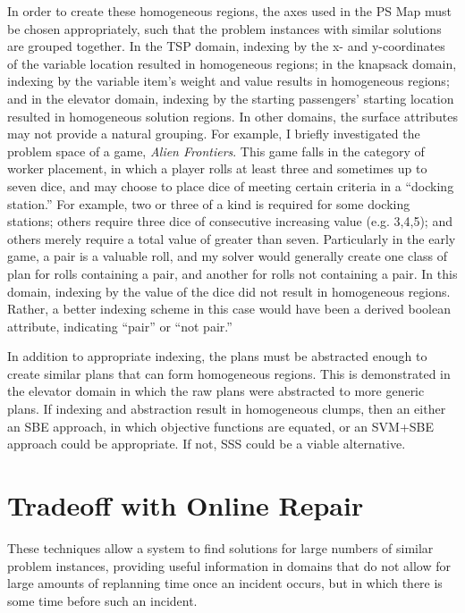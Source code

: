 In order to create these homogeneous regions, the axes used in the PS Map must be chosen appropriately, such that the problem instances with similar solutions are grouped together.  In the TSP domain, indexing by the x- and y-coordinates of the variable location resulted in homogeneous regions; in the knapsack domain, indexing by the variable item's weight and value results in homogeneous regions; and in the elevator domain, indexing by the starting passengers' starting location resulted in homogeneous solution regions.  In other domains, the surface attributes may not provide a natural grouping. For example, I briefly investigated the problem space of a game, \textit{Alien Frontiers}.    This game falls in the category of worker placement, in which a player rolls at least three and sometimes up to seven dice, and may choose to place dice of meeting certain criteria in a ``docking station.''  For example, two or three of a kind is required for some docking stations; others require three dice of consecutive increasing value (e.g. 3,4,5); and others merely require a total value of greater than seven.  Particularly in the early game, a pair is a valuable roll, and my solver would generally create one class of plan for rolls containing a pair, and another for rolls not containing a pair.  In this domain, indexing by the value of the dice did not result in homogeneous regions.  Rather, a better indexing scheme in this case would have been a derived boolean attribute, indicating ``pair'' or ``not pair.''

In addition to appropriate indexing, the plans must be abstracted enough to create similar plans that can form homogeneous regions.  This is demonstrated in the elevator domain in which the raw plans were abstracted to more generic plans.  If indexing and abstraction result in homogeneous clumps, then an either an SBE approach, in which objective functions are equated, or an SVM+SBE approach could be appropriate.  If not, SSS could be a viable alternative.


\section{Tradeoff with Online Repair}
These techniques allow a system to find solutions for large numbers of similar problem instances, providing useful information in domains that do not allow for large amounts of replanning time once an incident occurs, but in which there is some time before such an incident.  %

